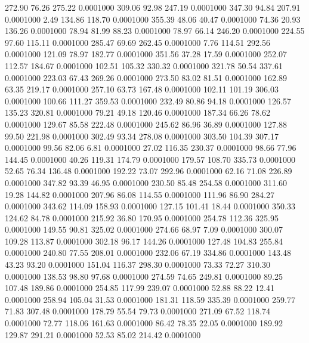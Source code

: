  272.90   76.26  275.22   0.0001000
 309.06   92.98  247.19   0.0001000
 347.30   94.84  207.91   0.0001000
   2.49  134.86  118.70   0.0001000
 355.39   48.06   40.47   0.0001000
  74.36   20.93  136.26   0.0001000
  78.94   81.99   88.23   0.0001000
  78.97   66.14  246.20   0.0001000
 224.55   97.60  115.11   0.0001000
 285.47   69.69  262.45   0.0001000
   7.76  114.51  292.56   0.0001000
 121.09   78.97  182.77   0.0001000
 351.56   37.28   17.59   0.0001000
 252.07  112.57  184.67   0.0001000
 102.51  105.32  330.32   0.0001000
 321.78   50.54  337.61   0.0001000
 223.03   67.43  269.26   0.0001000
 273.50   83.02   81.51   0.0001000
 162.89   63.35  219.17   0.0001000
 257.10   63.73  167.48   0.0001000
 102.11  101.19  306.03   0.0001000
 100.66  111.27  359.53   0.0001000
 232.49   80.86   94.18   0.0001000
 126.57  135.23  320.81   0.0001000
  79.21   49.18  120.46   0.0001000
 187.34   66.26   78.62   0.0001000
 129.67   85.58  222.48   0.0001000
 245.62   86.96   36.89   0.0001000
 127.88   99.50  221.98   0.0001000
 302.49   93.34  278.08   0.0001000
 303.50  104.39  307.17   0.0001000
  99.56   82.06    6.81   0.0001000
  27.02  116.35  230.37   0.0001000
  98.66   77.96  144.45   0.0001000
  40.26  119.31  174.79   0.0001000
 179.57  108.70  335.73   0.0001000
  52.65   76.34  136.48   0.0001000
 192.22   73.07  292.96   0.0001000
  62.16   71.08  226.89   0.0001000
 347.82   93.39   46.95   0.0001000
 230.50   85.48  254.58   0.0001000
 311.60   19.28  144.82   0.0001000
 207.96   86.08  114.55   0.0001000
 111.96   86.90  284.27   0.0001000
 343.62  114.09  158.93   0.0001000
 127.15  101.41   18.44   0.0001000
 350.33  124.62   84.78   0.0001000
 215.92   36.80  170.95   0.0001000
 254.78  112.36  325.95   0.0001000
 149.55   90.81  325.02   0.0001000
 274.66   68.97    7.09   0.0001000
 300.07  109.28  113.87   0.0001000
 302.18   96.17  144.26   0.0001000
 127.48  104.83  255.84   0.0001000
 240.80   77.55  208.01   0.0001000
 232.06   67.19  334.86   0.0001000
 143.48   43.23   93.20   0.0001000
 151.04  116.37  298.30   0.0001000
  73.33   72.27  310.30   0.0001000
 138.53   98.80   97.68   0.0001000
 274.59   74.65  249.81   0.0001000
  89.25  107.48  189.86   0.0001000
 254.85  117.99  239.07   0.0001000
  52.88   88.22   12.41   0.0001000
 258.94  105.04   31.53   0.0001000
 181.31  118.59  335.39   0.0001000
 259.77   71.83  307.48   0.0001000
 178.79   55.54   79.73   0.0001000
 271.09   67.52  118.74   0.0001000
  72.77  118.06  161.63   0.0001000
  86.42   78.35   22.05   0.0001000
 189.92  129.87  291.21   0.0001000
  52.53   85.02  214.42   0.0001000
